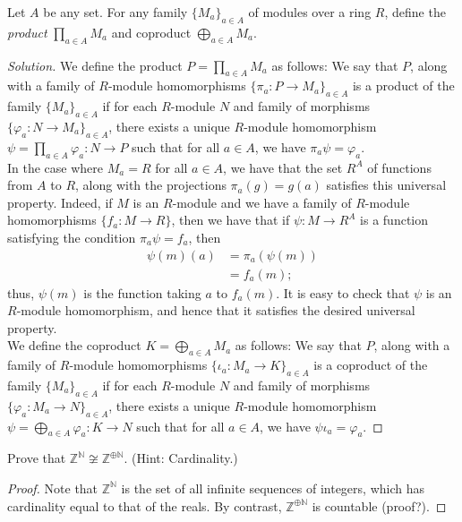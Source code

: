 \documentclass[12pt]{article}
\newenvironment{problem}[2][Problem]{\begin{trivlist}
\item[\hskip \labelsep {\bfseries #1}\hskip \labelsep {\bfseries #2.}]}{\end{trivlist}}
\newcommand{\N}{\mathbb{N}}
\newcommand{\Z}{\mathbb{Z}}
\newenvironment{solution}
  {\renewcommand\qedsymbol{$\blacksquare$}\begin{proof}[Solution]}
{\end{proof}}
\theoremstyle{remark}
\begin{document}
\begin{problem}{6.7}
  Let $A$ be any set.
  For any family $\{M_a\}_{a\in A}$ of modules over a ring $R$,
  define the \textit{product} $\prod_{a\in A}M_a$ and coproduct
  $\bigoplus_{a\in A} M_a$.
\end{problem}
\begin{solution}
  We define the product $P=\prod_{a\in A} M_a$ as follows:
  We say that $P$, along with a family of $R$-module 
  homomorphisms $\{\pi_a:P\to M_a\}_{a\in A}$
  is a product of the family $\{M_a\}_{a\in A}$ if for each 
  $R$-module $N$ and family of morphisms $\{\varphi_a:N\to M_a\}_{a\in A}$,
  there exists a unique $R$-module homomorphism 
  $\psi=\prod_{a\in A}\varphi_a:N\to P$ such that
  for all $a\in A$, we have $\pi_a\psi=\varphi_a$. \\
  \indent In the case where $M_a=R$ for all $a\in A$, we have that
  the set $R^A$ of functions from $A$ to $R$, along with the projections
  $\pi_a(g)=g(a)$ satisfies this universal property.
  Indeed, if $M$ is an $R$-module and we have a family of $R$-module
  homomorphisms $\{f_a:M\to R\}$, then we have that if $\psi:M\to R^A$ 
  is a function satisfying the condition $\pi_a\psi=f_a$, then
  \begin{align*}
    \psi(m)(a) &= \pi_a(\psi(m)) \\
    &= f_a(m);
  \end{align*}
  thus, $\psi(m)$ is the function taking $a$ to $f_a(m)$.
  It is easy to check that $\psi$ is an $R$-module homomorphism, and hence
  that it satisfies the desired universal property.
  \\
  \indent We define the coproduct $K=\bigoplus_{a\in A} M_a$ as follows:
  We say that $P$, along with a family of $R$-module 
  homomorphisms $\{\iota_a:M_a\to K\}_{a\in A}$
  is a coproduct of the family $\{M_a\}_{a\in A}$ if for each 
  $R$-module $N$ and family of morphisms $\{\varphi_a:M_a\to N\}_{a\in A}$,
  there exists a unique $R$-module homomorphism 
  $\psi=\bigoplus_{a\in A}\varphi_a:K\to N$ such that
  for all $a\in A$, we have $\psi\iota_a=\varphi_a$.
\end{solution}
  Prove that $\Z^\N\not\cong\Z^{\oplus\N}$. (Hint: Cardinality.)
\begin{proof}
  Note that $\Z^\N$ is the set of all infinite sequences of integers, which
  has cardinality equal to that of the reals.
  By contrast, $\Z^{\oplus\N}$ is countable (proof?).
\end{proof}
\end{document}
